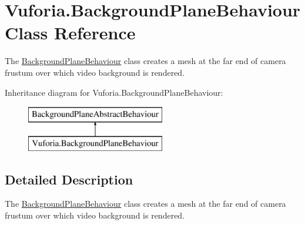 \hypertarget{class_vuforia_1_1_background_plane_behaviour}{}\section{Vuforia.\+Background\+Plane\+Behaviour Class Reference}
\label{class_vuforia_1_1_background_plane_behaviour}


The \hyperlink{class_vuforia_1_1_background_plane_behaviour}{Background\+Plane\+Behaviour} class creates a mesh at the far end of camera frustum over which video background is rendered.  


Inheritance diagram for Vuforia.\+Background\+Plane\+Behaviour\+:\begin{figure}[H]
\begin{center}
\leavevmode
\includegraphics[height=2.000000cm]{class_vuforia_1_1_background_plane_behaviour}
\end{center}
\end{figure}


\subsection{Detailed Description}
The \hyperlink{class_vuforia_1_1_background_plane_behaviour}{Background\+Plane\+Behaviour} class creates a mesh at the far end of camera frustum over which video background is rendered. 

